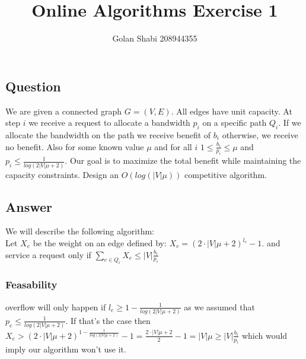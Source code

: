 \documentclass{article}
\title{Online Algorithms Exercise 1}
\author{Golan Shabi 208944355}
\begin{document}
\maketitle
\subsection*{Question}
We are given a connected graph $G=(V, E)$. All edges have unit capacity. At step $i$ we receive a request to allocate a bandwidth $p_i$ on a specific path $Q_i$. If we allocate the bandwidth on the path we receive benefit of $b_i$ otherwise, we receive no benefit. Also for some known value $\mu $ and for all $i$ $1 \leq \frac{b_i}{p_i} \leq  \mu$ and $p_i \leq  \frac{1}{log(2|V|\mu+2)}$. Our goal is to maximize the total benefit while maintaining the capacity constraints. Design an $O(log(|V|\mu))$ competitive algorithm.

\subsection*{Answer}
We will describe the following algorithm:\\
Let $X_e$ be the weight on an edge defined by: $X_e=(2\cdot|V|\mu + 2)^{l_e} - 1$. and service a request only if $ \sum_{e\in Q_i} X_e \leq |V| \frac{b_i}{p_i}$ \\

\subsubsection*{Feasability}

overflow will only happen if $l_e \geq 1-\frac{1}{log(2|V|\mu+2)}$ as we assumed that $p_e \leq  \frac{1}{log(2|V|\mu+2)}$. If that's the case then $X_e > (2\cdot|V|\mu + 2)^{1-\frac{1}{log(2|V|\mu+2)}} - 1 = \frac{2\cdot|V|\mu + 2}{2} - 1 = |V|\mu \geq |V|\frac{b_i}{p_i}$ which would imply our algorithm won't use it.\\
\end{document}
